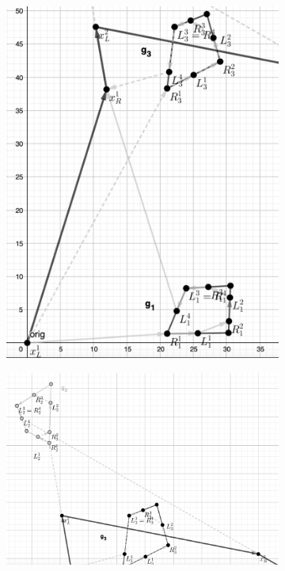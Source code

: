\documentclass[10pt,a4paper]{elsarticle}
\begin{document}
\begin{figure}[h!]
	\centering
	\begin{subfigure}[b]{0.4\textwidth}
		\includegraphics[width=\textwidth]{example_final-g1_g3_gray.png}%
		\caption{}
	\end{subfigure}
	\begin{subfigure}[b]{0.4\textwidth}
		\includegraphics[width=\textwidth]{example_final-g2_gray.png}

\end{subfigure}
\end{figure}
\end{document}
